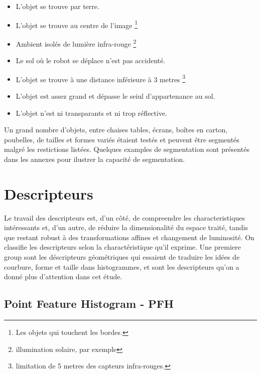 \begin{itemize}

\item L'objet se trouve par terre.
  
\item L'objet se trouve au centre de l'image \footnote{Les objets qui 
touchent les bordes.}

\item Ambient isolés de lumière infra-rouge \footnote{ illumination
  solaire, par exemple}


\item Le sol où le robot se déplace n'est pas accidenté.
  
  
\item L'objet se trouve à une distance inférieure à 3 metres \footnote{ limitation
  de 5 metres des capteurs infra-rouges.}
  
\item L'objet est assez grand et dépasse le seiul d'appartenance au
  sol.
  
\item L'objet n'est ni transparants et ni trop réflective.
  
\end{itemize}

Un grand nombre d'objets, entre chaises tables, écrans, boîtes en
carton, poubelles, de tailles et formes variés étaient testés et
peuvent être segmentés malgré les restictions listées. Quelques
examples de segmentation sont présentés dans les annexes pour ilustrer
la capacité de segmentation.

\section{Descripteurs}

Le travail des descripteurs est, d'un côté, de compreendre les
characteristiques intéressants et, d'un autre, de réduire la
dimensionalité du espace traité, tandis que restant robust à des
transformations affines et changement de luminosité. On classifie les
descripteurs selon la charactéristique qu'il exprime. Une premiere
group sont les déscripteurs géométriques qui essaient de traduire les
idées de courbure, forme et taille dans histogrammes, et sont les
descripteurs qu'on a donné plus d'attention dans cet étude.

\subsection{Point Feature Histogram - PFH}

